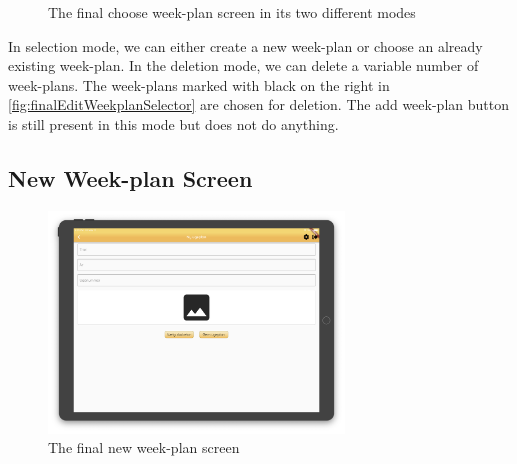 \begin{figure}%
    \centering
    \quad
    \caption{The final choose week-plan screen in its two different modes}%
    \label{fig:finalEditWeekplanSelector}%
\end{figure}

In selection mode, we can either create a new week-plan or choose an already existing week-plan. In the deletion mode, we can delete a variable number of week-plans. The week-plans marked with black on the right in \autoref{fig:finalEditWeekplanSelector} are chosen for deletion. The add week-plan button is still present in this mode but does not do anything.

\subsection{New Week-plan Screen}

\begin{figure}[H]
    \begin{center}
        \includegraphics[width=0.7\textwidth]{figures/FinalScreen/addWeekplanScreen.png}
    \end{center}
    \caption{The final new week-plan screen}
    \label{fig:finalAddWeekplanSelector}
\end{figure}

